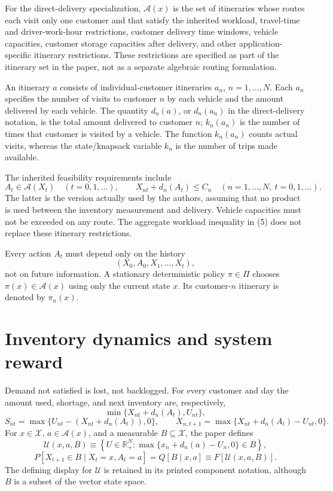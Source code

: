 \documentclass{article}
\begin{document}
For the direct-delivery specialization, $\mathcal A(x)$ is the set of itineraries whose routes each visit only one customer and that satisfy the inherited workload, travel-time and driver-work-hour restrictions, customer delivery time windows, vehicle capacities, customer storage capacities after delivery, and other application-specific itinerary restrictions. These restrictions are specified as part of the itinerary set in the paper, not as a separate algebraic routing formulation.

An itinerary $a$ consists of individual-customer itineraries $a_n$, $n=1,\ldots,N$. Each $a_n$ specifies the number of visits to customer $n$ by each vehicle and the amount delivered by each vehicle. The quantity $d_n(a)$, or $d_n(a_n)$ in the direct-delivery notation, is the total amount delivered to customer $n$; $k_n(a_n)$ is the number of times that customer is visited by a vehicle. The function $k_n(a_n)$ counts actual visits, whereas the state/knapsack variable $k_n$ is the number of trips made available.

The inherited feasibility requirements include
\[
A_t\in\mathcal A(X_t)\quad(t=0,1,\ldots),
\qquad
X_{nt}+d_n(A_t)\leq C_n
\quad(n=1,\ldots,N,\ t=0,1,\ldots).
\]
The latter is the version actually used by the authors, assuming that no product is used between the inventory measurement and delivery. Vehicle capacities must not be exceeded on any route. The aggregate workload inequality in (5) does not replace these itinerary restrictions.

Every action $A_t$ must depend only on the history
\[
(X_0,A_0,X_1,\ldots,X_t),
\]
not on future information. A stationary deterministic policy $\pi\in\Pi$ chooses $\pi(x)\in\mathcal A(x)$ using only the current state $x$. Its customer-$n$ itinerary is denoted by $\pi_n(x)$.

\section*{Inventory dynamics and system reward}

Demand not satisfied is lost, not backlogged. For every customer and day the amount used, shortage, and next inventory are, respectively,
\[
\min\{X_{nt}+d_n(A_t),U_{nt}\},
\]
\[
S_{nt}=\max\{U_{nt}-(X_{nt}+d_n(A_t)),0\},
\qquad
X_{n,t+1}=\max\{X_{nt}+d_n(A_t)-U_{nt},0\}.
\]
For $x\in\mathcal X$, $a\in\mathcal A(x)$, and a measurable $B\subseteq\mathcal X$, the paper defines
\[
\mathcal U(x,a,B)\equiv
\left\{U\in\mathbb R_+^N:
\max\{x_n+d_n(a)-U_n,0\}\in B\right\},
\]
\[
P[X_{t+1}\in B\mid X_t=x,A_t=a]
=Q[B\mid x,a]\equiv F[\mathcal U(x,a,B)].
\]
The defining display for $\mathcal U$ is retained in its printed component notation, although $B$ is a subset of the vector state space.
\end{document}
